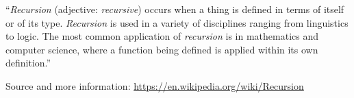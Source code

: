 ``\emph{Recursion} (adjective: \emph{recursive}) occurs when a thing is defined 
in terms of itself or of its type.
\emph{Recursion} is used in a variety of disciplines ranging from linguistics 
to logic.
The most common application of \emph{recursion} is in mathematics and computer 
science,
where a function being defined is applied within its own definition.''

Source and more information: \url{https://en.wikipedia.org/wiki/Recursion}